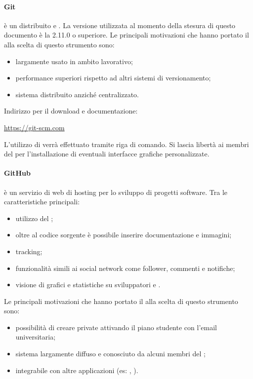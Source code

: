         \paragraph{Git}
         è un  distribuito e . La versione utilizzata al momento della stesura di questo documento è la 2.11.0 o superiore.
        Le principali motivazioni che hanno portato il  alla scelta di questo strumento sono:
        \begin{itemize}
        	\item largamente usato in ambito lavorativo;
        	\item performance superiori rispetto ad altri sistemi di versionamento;
        	\item sistema distribuito anziché centralizzato.
        \end{itemize}
        Indirizzo per il download e documentazione:
        \begin{center}
        	\url{https://git-scm.com}
        \end{center}
        L'utilizzo di  verrà effettuato tramite riga di comando. Si lascia libertà ai membri del  per l'installazione di eventuali interfacce grafiche personalizzate.
        \paragraph{GitHub}
         è un servizio di web di hosting per lo sviluppo di progetti software. Tra le caratteristiche principali:
        \begin{itemize}
        	\item utilizzo del  ;
        	\item oltre al codice sorgente è possibile inserire documentazione e immagini;
        	\item {} tracking;
        	\item funzionalità simili ai social network come follower, commenti e notifiche;
        	\item visione di grafici e statistiche su sviluppatori e .
        \end{itemize}
        Le principali motivazioni che hanno portato il  alla scelta di questo strumento sono:
        \begin{itemize}
        	\item possibilità di creare  private attivando il piano studente con l'email universitaria;
        	\item sistema largamente diffuso e conosciuto da alcuni membri del ;
        	\item integrabile con altre applicazioni (es: , ).
        \end{itemize}
